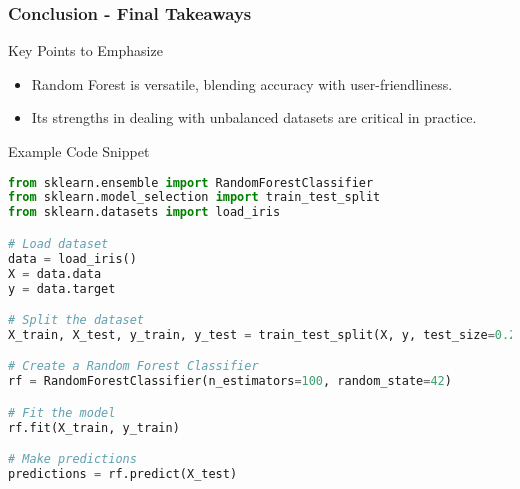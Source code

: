 \documentclass[aspectratio=169]{beamer}
\begin{document}
\begin{frame}[fragile]
    \frametitle{Conclusion - Final Takeaways}
    \begin{block}{Key Points to Emphasize}
        \begin{itemize}
            \item Random Forest is versatile, blending accuracy with user-friendliness.
            \item Its strengths in dealing with unbalanced datasets are critical in practice.
        \end{itemize}
    \end{block}
    \begin{block}{Example Code Snippet}
        \begin{lstlisting}[language=Python]
from sklearn.ensemble import RandomForestClassifier
from sklearn.model_selection import train_test_split
from sklearn.datasets import load_iris

# Load dataset
data = load_iris()
X = data.data
y = data.target

# Split the dataset
X_train, X_test, y_train, y_test = train_test_split(X, y, test_size=0.2, random_state=42)

# Create a Random Forest Classifier
rf = RandomForestClassifier(n_estimators=100, random_state=42)

# Fit the model
rf.fit(X_train, y_train)

# Make predictions
predictions = rf.predict(X_test)
        \end{lstlisting}
    \end{block}
\end{frame}
\end{document}

